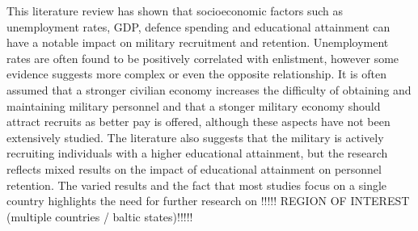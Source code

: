 This literature review has shown that socioeconomic factors such as unemployment rates, 
GDP, defence spending and educational attainment can have a notable impact on military 
recruitment and retention. Unemployment rates are often found to be positively correlated 
with enlistment, however some evidence suggests more complex or even the opposite 
relationship. It is often assumed that a stronger civilian economy increases the 
difficulty of obtaining and maintaining military personnel and that a stonger military 
economy should attract recruits as better pay is offered, although these aspects have 
not been extensively studied. The literature also suggests that the military is 
actively recruiting individuals with a higher educational attainment, but the research 
reflects mixed results on the impact of educational attainment on personnel retention. 
The varied results and the fact that most studies focus on a single country highlights 
the need for further research on !!!!! REGION OF INTEREST (multiple countries / baltic states)!!!!!
